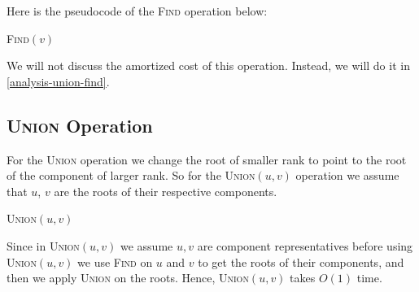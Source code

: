 Here is the pseudocode of the \textsc{Find} operation below:
\begin{algorithm}[]
	\caption{\textsc{Find}$(v)$}
	\DontPrintSemicolon
\end{algorithm}We will not discuss the amortized cost of this operation. Instead, we will do it in \autoref{analysis-union-find}.
\subsection{\textsc{Union} Operation}
For the \textsc{Union} operation we change the root of smaller rank to point to the root of the component of larger rank. So for the \textsc{Union}$(u,v)$ operation we assume that $u$, $v$ are the roots of their respective components.
\begin{algorithm}[]
	\caption{\textsc{Union}$(u,v)$}
	\DontPrintSemicolon
\end{algorithm}
Since in \textsc{Union}$(u,v)$ we assume $u,v$ are component representatives before using \textsc{Union}$(u,v)$ we use \textsc{Find} on $u$ and $v$ to get the roots of their components, and then we apply \textsc{Union} on the roots. Hence, \textsc{Union}$(u,v)$ takes $O(1)$ time.
